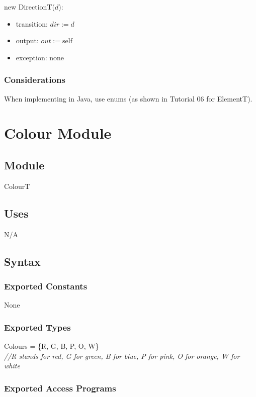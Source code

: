 \documentclass[12pt]{article}
\begin{document}
\noindent new DirectionT($d$):
\begin{itemize}
	\item transition: $\mathit{dir} := d$
	\item output: $out := \mbox{self}$
	\item exception: none
\end{itemize}

\subsubsection* {Considerations}

When implementing in Java, use enums (as shown in Tutorial 06 for ElementT).

\newpage

\section* {Colour Module}

\subsection*{Module}

ColourT

\subsection* {Uses}

N/A

\subsection* {Syntax}

\subsubsection* {Exported Constants}

None

\subsubsection* {Exported Types}

Colours = \{R, G, B, P, O,  W\}\\

\noindent \textit{//R stands for red, G for green, B for blue, P for pink, O for orange, W for white}

\subsubsection* {Exported Access Programs}
\end{document}
